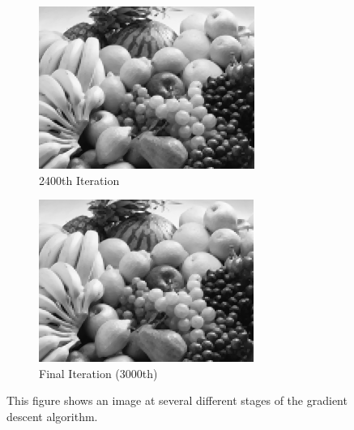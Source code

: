 \documentclass{paper}
\begin{document}
\begin{enumerate}
\begin{figure}[]
\begin{center}
\begin{subfigure}[b]{0.49\textwidth}
                \includegraphics[width=\textwidth]{it2400}
                \caption{2400th Iteration}
        \end{subfigure}
        \begin{subfigure}[b]{0.49\textwidth}
                \includegraphics[width=\textwidth]{itfinal}
                \caption{Final Iteration (3000th)}
        \end{subfigure}
\end{center}
\caption{This figure shows an image at several different stages of the gradient descent algorithm. }
\label{fig:iterations}
\end{figure}


\end{enumerate}
\end{document}
